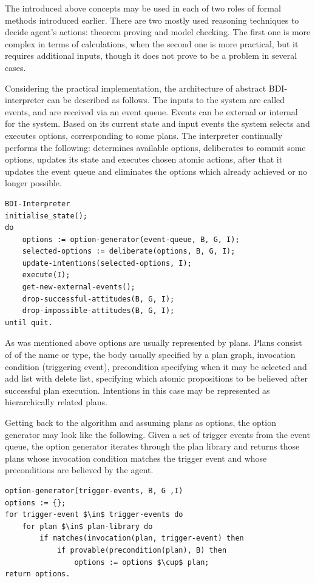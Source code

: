 The introduced above concepts may be used in each of two roles of formal methods introduced earlier. There are two mostly used reasoning techniques to decide agent's actions: theorem proving and model checking. The first one is more complex in terms of calculations, when the second one is more practical, but it requires additional inputs, though it does not prove to be a problem in several cases.

Considering the practical implementation, the architecture of abstract BDI-interpreter can be described as follows. The inputs to the system are called events, and are received via an event queue. Events can be external or internal for the system. Based on its current state and input events the system selects and executes options, corresponding to some plans. The interpreter continually performs the following: determines available options, deliberates to commit some options, updates its state and executes chosen atomic actions, after that it updates the event queue and eliminates the options which already achieved or no longer possible.
%
\begin{lstlisting}
BDI-Interpreter
initialise_state();
do
    options := option-generator(event-queue, B, G, I);
    selected-options := deliberate(options, B, G, I);
    update-intentions(selected-options, I);
    execute(I);
    get-new-external-events();
    drop-successful-attitudes(B, G, I);
    drop-impossible-attitudes(B, G, I);
until quit.
\end{lstlisting}

As was mentioned above options are usually represented by plans. Plans consist of of the name or type, the body usually specified by a plan graph, invocation condition (triggering event), precondition specifying when it may be selected and add list with delete list, specifying which atomic propositions to be believed after successful plan execution. Intentions in this case may be represented as hierarchically related plans.

Getting back to the algorithm and assuming plans as options, the option generator may look like the following.
Given a set of trigger events from the event queue, the option generator iterates through the plan library and returns those plans whose invocation condition
matches the trigger event and whose preconditions are believed by the agent.
%
\begin{lstlisting}[mathescape]
option-generator(trigger-events, B, G ,I)
options := {};
for trigger-event $\in$ trigger-events do
    for plan $\in$ plan-library do
        if matches(invocation(plan, trigger-event) then
            if provable(precondition(plan), B) then
                options := options $\cup$ plan;
return options.
\end{lstlisting}

